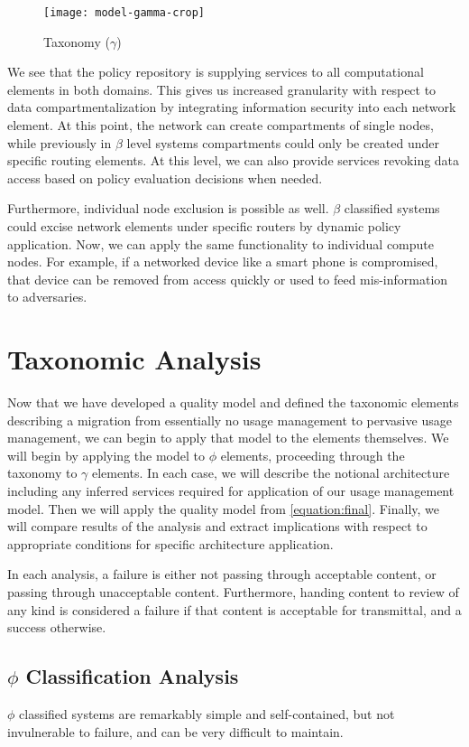 \begin{figure}[!t]
\centering
\texttt{[image: model-gamma-crop]}
\caption{Taxonomy ($\gamma$)}
\label{fig:model:taxonomy-gamma}
\end{figure}

We see that the policy repository is supplying services to all computational elements in both domains.  This gives us increased granularity with respect to data compartmentalization by integrating information security into each network element.  At this point, the network can create compartments of single nodes, while previously in $\beta$ level systems compartments could only be created under specific routing elements.  At this level, we can also provide services revoking data access based on policy evaluation decisions when needed.

Furthermore, individual node exclusion is possible as well. $\beta$ classified systems could excise network elements under specific routers by dynamic policy application.  Now, we can apply the same functionality to individual compute nodes.  For example, if a networked device like a smart phone is compromised, that device can be removed from access quickly or used to feed mis-information to adversaries.

\section{Taxonomic Analysis}
Now that we have developed a quality model and defined the taxonomic elements describing a migration from essentially no usage management to pervasive usage management, we can begin to apply that model to the elements themselves.  We will begin by applying the model to $\phi$ elements, proceeding through the taxonomy to $\gamma$ elements.  In each case, we will describe the notional architecture including any inferred services required for application of our usage management model.  Then we will apply the quality model from \ref{equation:final}.  Finally, we will compare results of the analysis and extract implications with respect to appropriate conditions for specific architecture application.

In each analysis, a failure is either not passing through acceptable content, or passing through unacceptable content. Furthermore, handing content to review of any kind is considered a failure if that content is acceptable for transmittal, and a success otherwise.

\subsection{$\phi$ Classification Analysis}
$\phi$ classified systems are remarkably simple and self-contained, but not invulnerable to failure, and can be very difficult to maintain.

